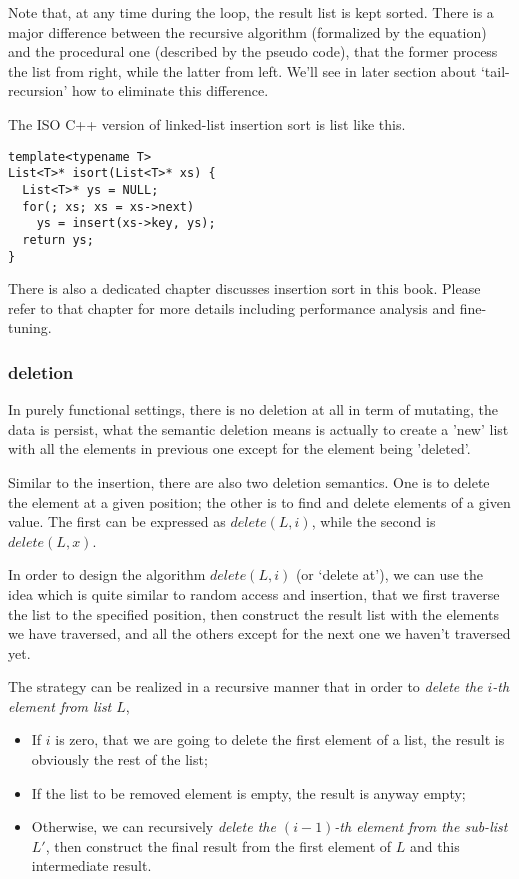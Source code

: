 \documentclass{article}
\begin{document}
Note that, at any time during the loop, the result list is kept sorted. There is
a major difference between the recursive algorithm (formalized by the equation) and
the procedural one (described by the pseudo code), that the former process the list
from right, while the latter from left. We'll see in later section about `tail-recursion'
how to eliminate this difference.

The ISO C++ version of linked-list insertion sort is list like this.

\lstset{language=C++}
\begin{lstlisting}
template<typename T>
List<T>* isort(List<T>* xs) {
  List<T>* ys = NULL;
  for(; xs; xs = xs->next)
    ys = insert(xs->key, ys);
  return ys;
}
\end{lstlisting}

There is also a dedicated chapter discusses insertion sort in this book. Please refer to that chapter for
more details including performance analysis and fine-tuning.

\subsubsection{deletion}
In purely functional settings, there is no deletion at all in term of mutating, the data is persist, what
the semantic deletion means is actually to create a 'new' list with all the elements in previous one except for
the element being 'deleted'. 

Similar to the insertion, there are also two deletion semantics. One is to delete the element at a given position;
the other is to find and delete elements of a given value. The first can be expressed as $delete(L, i)$, while
the second is $delete(L, x)$.

In order to design the algorithm $delete(L,i)$ (or `delete at'), we can use the idea which is quite similar to 
random access and insertion, that we first traverse the list to the specified position, then construct the 
result list with the elements we have traversed, and all the others except for          the next one we haven't traversed yet.

The strategy can be realized in a recursive manner that in order to {\em delete the $i$-th element from list $L$},
\begin{itemize}
\item If $i$ is zero, that we are going to delete the first element of a list, the result is obviously the rest of the list;
\item If the list to be removed element is empty, the result is anyway empty;
\item Otherwise, we can recursively {\em delete the $(i-1)$-th element from the sub-list $L'$}, then construct the final
result from the first element of $L$ and this intermediate result.
\end{itemize}
\end{document}
